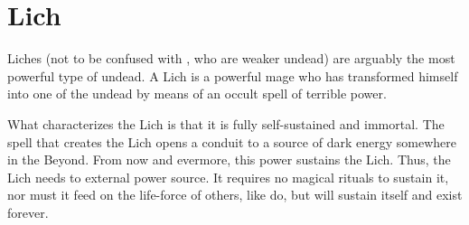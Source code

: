\begin{comment}
To ensure her obedience, a \Reavers{} will often lie to his \Leech{} slave, convincing her that only his blood (not that of another \Reaver) will keep her alive and keeping her ignorant of how she might become a \Reaver. 

A \Reaver{} may create any number of \Leeches{} he desires, but each of them must drink his blood every month or die, and letting the \Leech{} drink his blood temporarily weakens the \Reaver, so he will not want too many mouths to feed. More importantly, a large group of \Leeches{} may mutiny against their master (as described above), so a \Reaver{} will not want to create more of them than he can control. 









\subsection{Habitat}
\Leeches{} always live near their \Reaver{} master (or they won't live long). But since they are less vulnerable to sunlight, they are more easily able to lead normal-seeming lives and not arouse suspicion. 
\end{comment}
















\section{Lich}
Liches (not to be confused with \Leeches, who are weaker undead) are arguably the most powerful type of undead. A Lich is a powerful mage who has transformed himself into one of the undead by means of an occult spell of terrible power. 

What characterizes the Lich is that it is fully self-sustained and immortal. The spell that creates the Lich opens a conduit to a source of dark energy somewhere in the Beyond. From now and evermore, this power sustains the Lich. Thus, the Lich needs to external power source. It requires no magical rituals to sustain it, nor must it feed on the life-force of others, like \Reavers{} do, but will sustain itself and exist forever.

